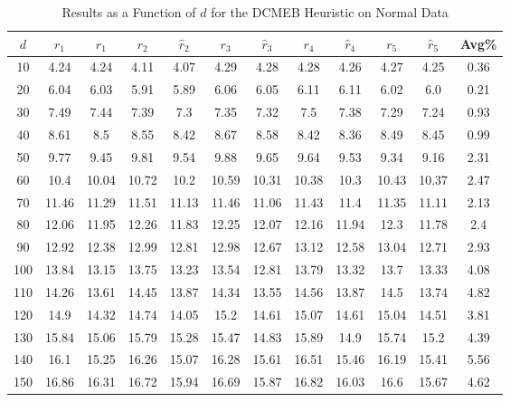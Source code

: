\documentclass[11pt,twoside]{report}
\theoremstyle{definition}
\numberwithin{theorem}{section}
\numberwithin{definition}{section}
\numberwithin{lemma}{section}
\numberwithin{proposition}{section}
\numberwithin{equation}{section}
\numberwithin{figure}{section}
\begin{document}
\begin{appendices}
    \begin{table}[ht]
        \centering
        \begin{tabular}{|c||cc||cc||cc||cc||cc||c|} \hline
            $d$&$r_1$&$\hat{r}_1$&$r_2$&$\hat{r}_2$&$r_3$&$\hat{r}_3$&$r_4$&$\hat{r}_4$&$r_5$&$\hat{r}_5$&Avg\% \\ \hline
            10&4.24&4.24&4.11&4.07&4.29&4.28&4.28&4.26&4.27&4.25&0.36 \\
            20&6.04&6.03&5.91&5.89&6.06&6.05&6.11&6.11&6.02&6.0&0.21 \\
            30&7.49&7.44&7.39&7.3&7.35&7.32&7.5&7.38&7.29&7.24&0.93 \\
            40&8.61&8.5&8.55&8.42&8.67&8.58&8.42&8.36&8.49&8.45&0.99 \\
            50&9.77&9.45&9.81&9.54&9.88&9.65&9.64&9.53&9.34&9.16&2.31 \\
            60&10.4&10.04&10.72&10.2&10.59&10.31&10.38&10.3&10.43&10.37&2.47 \\
            70&11.46&11.29&11.51&11.13&11.46&11.06&11.43&11.4&11.35&11.11&2.13 \\
            80&12.06&11.95&12.26&11.83&12.25&12.07&12.16&11.94&12.3&11.78&2.4 \\
            90&12.92&12.38&12.99&12.81&12.98&12.67&13.12&12.58&13.04&12.71&2.93 \\
            100&13.84&13.15&13.75&13.23&13.54&12.81&13.79&13.32&13.7&13.33&4.08 \\
            110&14.26&13.61&14.45&13.87&14.34&13.55&14.56&13.87&14.5&13.74&4.82 \\
            120&14.9&14.32&14.74&14.05&15.2&14.61&15.07&14.61&15.04&14.51&3.81 \\
            130&15.84&15.06&15.79&15.28&15.47&14.83&15.89&14.9&15.74&15.2&4.39 \\
            140&16.1&15.25&16.26&15.07&16.28&15.61&16.51&15.46&16.19&15.41&5.56 \\
            150&16.86&16.31&16.72&15.94&16.69&15.87&16.82&16.03&16.6&15.67&4.62 \\ \hline
        \end{tabular}
        \caption{Results as a Function of $d$ for the DCMEB Heuristic on Normal Data}
        \label{tab:normal_dcmeb_table_d}
    \end{table}
    

\end{appendices}
\end{document}
